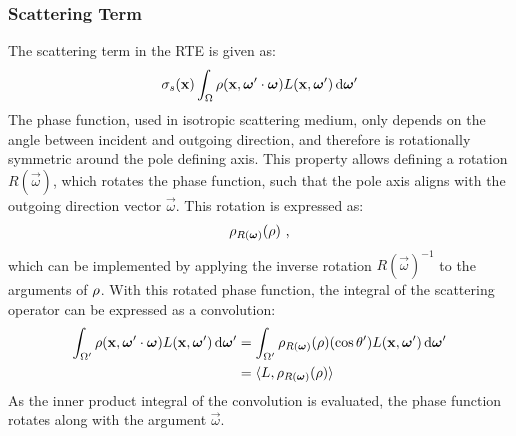 \subsubsection*{Scattering Term}

The scattering term in the RTE is given as:
\begin{align*}
\sigma_s(\boldsymbol{\mathbf{x}})\int_{\Omega}\rho(\boldsymbol{\mathbf{x}}, \boldsymbol{\mathbf{\omega}}'\cdot\boldsymbol{\mathbf{\omega}})L(\boldsymbol{\mathbf{x}}, \boldsymbol{\mathbf{\omega}}')\,\mathrm{d}\boldsymbol{\mathbf{\omega}}'
\end{align*}
The phase function, used in isotropic scattering medium, only depends on the angle between incident and outgoing direction, and therefore is rotationally symmetric around the pole defining axis. This property allows defining a rotation $R(\vec{\omega})$, which rotates the phase function, such that the pole axis aligns with the outgoing direction vector $\vec{\omega}$. This rotation is expressed as:
\begin{align*}
\rho_{R(\boldsymbol{\mathbf{\omega}})}(\rho)
\ ,
\end{align*}
which can be implemented by applying the inverse rotation $R(\vec{\omega})^{-1}$ to the arguments of $\rho$. With this rotated phase function, the integral of the scattering operator can be expressed as a convolution:
\begin{align}
\int_{\Omega'}\rho(\boldsymbol{\mathbf{x}}, \boldsymbol{\mathbf{\omega}}'\cdot\boldsymbol{\mathbf{\omega}})L(\boldsymbol{\mathbf{x}}, \boldsymbol{\mathbf{\omega}}')\,\mathrm{d}\boldsymbol{\mathbf{\omega}}'
&=
\int_{\Omega'}{\rho_{R(\boldsymbol{\mathbf{\omega}})}(\rho)(\operatorname{cos}\theta')L(\boldsymbol{\mathbf{x}}, \boldsymbol{\mathbf{\omega}}')\,\mathrm{d}\boldsymbol{\mathbf{\omega}}'}
\nonumber\\
&= \langle L,  \rho_{R(\boldsymbol{\mathbf{\omega}})}(\rho)\rangle
\label{eq:complex_scatt_conv}
\end{align}
As the inner product integral of the convolution is evaluated, the phase function rotates along with the argument $\vec{\omega}$.

